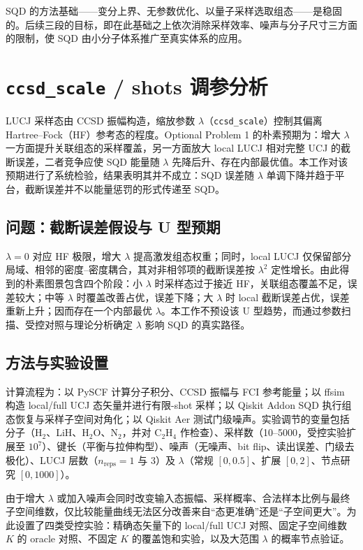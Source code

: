 \documentclass[UTF8,12pt,a4paper]{ctexart}
\newcommand{\Htwo}{H$_2$}
\newcommand{\HtwoO}{H$_2$O}
\newcommand{\Ntwo}{N$_2$}
\begin{document}
SQD 的方法基础——变分上界、无参数优化、以量子采样选取组态——是稳固的。后续三段的目标，即在此基础之上依次消除采样效率、噪声与分子尺寸三方面的限制，使 SQD 由小分子体系推广至真实体系的应用。

\section{\texttt{ccsd\_scale} / shots 调参分析}

LUCJ 采样态由 CCSD 振幅构造，缩放参数 $\lambda$（\texttt{ccsd\_scale}）控制其偏离 Hartree--Fock（HF）参考态的程度。Optional Problem 1 的朴素预期为：增大 $\lambda$ 一方面提升关联组态的采样覆盖，另一方面放大 local LUCJ 相对完整 UCJ 的截断误差，二者竞争应使 SQD 能量随 $\lambda$ 先降后升、存在内部最优值。本工作对该预期进行了系统检验，结果表明其并不成立：SQD 误差随 $\lambda$ 单调下降并趋于平台，截断误差并不以能量惩罚的形式传递至 SQD。

\subsection{问题：截断误差假设与 U 型预期}

$\lambda=0$ 对应 HF 极限，增大 $\lambda$ 提高激发组态权重；同时，local LUCJ 仅保留部分局域、相邻的密度--密度耦合，其对非相邻项的截断误差按 $\lambda^2$ 定性增长。由此得到的朴素图景包含四个阶段：小 $\lambda$ 时采样态过于接近 HF，关联组态覆盖不足，误差较大；中等 $\lambda$ 时覆盖改善占优，误差下降；大 $\lambda$ 时 local 截断误差占优，误差重新上升；因而存在一个内部最优 $\lambda$。本工作不预设该 U 型趋势，而通过参数扫描、受控对照与理论分析确定 $\lambda$ 影响 SQD 的真实路径。

\subsection{方法与实验设置}

计算流程为：以 PySCF 计算分子积分、CCSD 振幅与 FCI 参考能量；以 ffsim 构造 local/full UCJ 态矢量并进行有限-shot 采样；以 Qiskit Addon SQD 执行组态恢复与采样子空间对角化；以 Qiskit Aer 测试门级噪声。实验调节的变量包括分子（\Htwo{}、LiH、\HtwoO{}、\Ntwo{}，并对 C$_2$H$_4$ 作检查）、采样数（10--5000，受控实验扩展至 $10^7$）、键长（平衡与拉伸构型）、噪声（无噪声、bit flip、读出误差、门级去极化）、LUCJ 层数（$n_{\text{reps}}=1$ 与 $3$）及 $\lambda$（常规 $[0,0.5]$、扩展 $[0,2]$、节点研究 $[0,1000]$）。

由于增大 $\lambda$ 或加入噪声会同时改变输入态振幅、采样概率、合法样本比例与最终子空间维数，仅比较能量曲线无法区分改善来自``态更准确''还是``子空间更大''。为此设置了四类受控实验：精确态矢量下的 local/full UCJ 对照、固定子空间维数 $K$ 的 oracle 对照、不固定 $K$ 的覆盖饱和实验，以及大范围 $\lambda$ 的概率节点验证。
\end{document}
